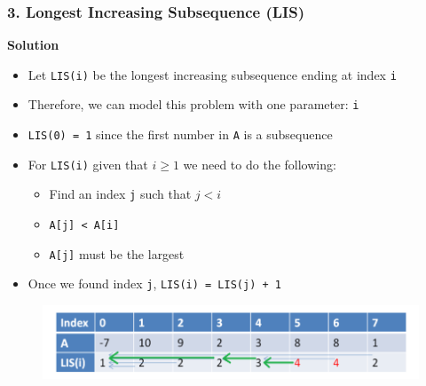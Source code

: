 \documentclass{beamer}
\begin{document}
\begin{frame}[fragile]
\frametitle{3. Longest Increasing Subsequence (LIS)}

\color{red}\textbf{Solution}\color{black} \\

\begin{itemize}
    \item Let \verb|LIS(i)| be the longest increasing subsequence ending at index \verb|i|
    \item Therefore, we can model this problem with one parameter: \verb|i|
    \pause
    \item \color{blue}\verb|LIS(0) = 1| \color{black} since the first number in \verb|A| is a subsequence
    \pause
    \item For \color{blue}\verb|LIS(i)| \color{black} given that $i \geq 1$ we need to do the following:
    
    	\begin{itemize}
			\pause
		    \item Find an index \verb|j| such that $j < i$
		    \pause
		    \item \verb|A[j] < A[i]|
		    
		    \pause
		    \item \verb|A[j]| must be the largest
		\end{itemize}
		
	\pause
	\item Once we found index \verb|j|, \color{blue}\verb|LIS(i) = LIS(j) + 1| \color{black}
    
\end{itemize}

\begin{figure}
    \centering
    \includegraphics[scale=0.5]{imgs/lis_1.png}
\end{figure}

\end{frame}
\end{document}
